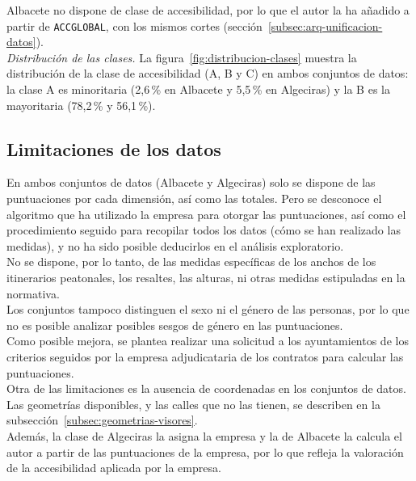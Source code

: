 Albacete no dispone de clase de accesibilidad, por lo que el autor la ha añadido a partir de \texttt{ACCGLOBAL}, con los mismos cortes (sección~\ref{subsec:arq-unificacion-datos}).
\\

\noindent\textit{Distribución de las clases.} La figura~\ref{fig:distribucion-clases} muestra la distribución de la clase de accesibilidad (A, B y C) en ambos conjuntos de datos: la clase A es minoritaria (2,6\,\% en Albacete y 5,5\,\% en Algeciras) y la B es la mayoritaria (78,2\,\% y 56,1\,\%).



\subsection{Limitaciones de los datos}
\label{sec:limitaciones-datos}

En ambos conjuntos de datos (Albacete y Algeciras) solo se dispone de las puntuaciones por cada dimensión, así como las totales. Pero se desconoce el algoritmo que ha utilizado la empresa para otorgar las puntuaciones, así como el procedimiento seguido para recopilar todos los datos (cómo se han realizado las medidas), y no ha sido posible deducirlos en el análisis exploratorio.
\\

No se dispone, por lo tanto, de las medidas específicas de los anchos de los itinerarios peatonales, los resaltes, las alturas, ni otras medidas estipuladas en la normativa.
\\

Los conjuntos tampoco distinguen el sexo ni el género de las personas, por lo que no es posible analizar posibles sesgos de género en las puntuaciones.
\\

Como posible mejora, se plantea realizar una solicitud a los ayuntamientos de los criterios seguidos por la empresa adjudicataria de los contratos para calcular las puntuaciones.
\\

Otra de las limitaciones es la ausencia de coordenadas en los conjuntos de datos. Las geometrías disponibles, y las calles que no las tienen, se describen en la subsección~\ref{subsec:geometrias-visores}.
\\

Además, la clase de Algeciras la asigna la empresa y la de Albacete la calcula el autor a partir de las puntuaciones de la empresa, por lo que refleja la valoración de la accesibilidad aplicada por la empresa.
\\

